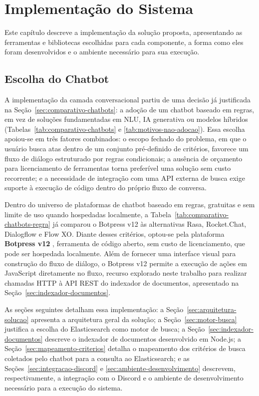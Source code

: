 \chapter{Implementação do Sistema}\label{chp:EXPERIMENTOS}

Este capítulo descreve a implementação da solução proposta, apresentando as ferramentas e bibliotecas escolhidas para cada componente, a forma como eles foram desenvolvidos e o ambiente necessário para sua execução.

\section{Escolha do Chatbot}

A implementação da camada conversacional partiu de uma decisão já justificada na Seção~\ref{sec:comparativo-chatbots}: a adoção de um chatbot baseado em regras, em vez de soluções fundamentadas em NLU, IA generativa ou modelos híbridos (Tabelas~\ref{tab:comparativo-chatbots} e \ref{tab:motivos-nao-adocao}). Essa escolha apoiou-se em três fatores combinados: o escopo fechado do problema, em que o usuário busca atas dentro de um conjunto pré-definido de critérios, favorece um fluxo de diálogo estruturado por regras condicionais; a ausência de orçamento para licenciamento de ferramentas torna preferível uma solução sem custo recorrente; e a necessidade de integração com uma API externa de busca exige suporte à execução de código dentro do próprio fluxo de conversa.

Dentro do universo de plataformas de chatbot baseado em regras, gratuitas e sem limite de uso quando hospedadas localmente, a Tabela~\ref{tab:comparativo-chatbots-regra} já comparou o Botpress v12 às alternativas Rasa, Rocket.Chat, Dialogflow e Flow XO. Diante desses critérios, optou-se pela plataforma \textbf{Botpress v12} \cite{botpress-about, botpress-docs}, ferramenta de código aberto, sem custo de licenciamento, que pode ser hospedada localmente. Além de fornecer uma interface visual para construção do fluxo de diálogo, o Botpress v12 permite a execução de ações em JavaScript diretamente no fluxo, recurso explorado neste trabalho para realizar chamadas HTTP à API REST do indexador de documentos, apresentado na Seção~\ref{sec:indexador-documentos}.

As seções seguintes detalham essa implementação: a Seção~\ref{sec:arquitetura-solucao} apresenta a arquitetura geral da solução; a Seção~\ref{sec:motor-busca} justifica a escolha do Elasticsearch como motor de busca; a Seção~\ref{sec:indexador-documentos} descreve o indexador de documentos desenvolvido em Node.js; a Seção~\ref{sec:mapeamento-criterios} detalha o mapeamento dos critérios de busca coletados pelo chatbot para a consulta ao Elasticsearch; e as Seções~\ref{sec:integracao-discord} e \ref{sec:ambiente-desenvolvimento} descrevem, respectivamente, a integração com o Discord e o ambiente de desenvolvimento necessário para a execução do sistema.

